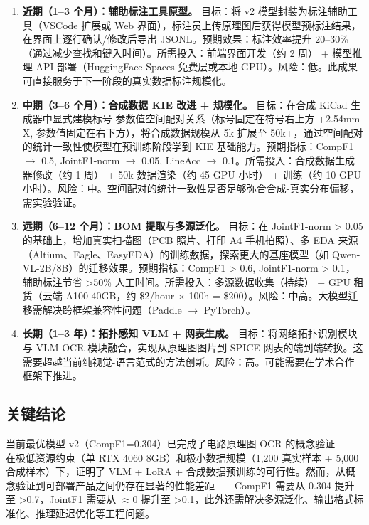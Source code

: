 \begin{enumerate}
    \item \textbf{近期（1--3 个月）：辅助标注工具原型。}
    目标：将 v2 模型封装为标注辅助工具（VSCode 扩展或 Web 界面），标注员上传原理图后获得模型预标注结果，在界面上逐行确认/修改后导出 JSONL。预期效果：标注效率提升 20--30\%（通过减少查找和键入时间）。所需投入：前端界面开发（约 2 周） + 模型推理 API 部署（HuggingFace Spaces 免费层或本地 GPU）。风险：低。此成果可直接服务于下一阶段的真实数据标注规模化。

    \item \textbf{中期（3--6 个月）：合成数据 KIE 改进 + 规模化。}
    目标：在合成 KiCad 生成器中显式建模标号-参数值空间配对关系（标号固定在符号右上方 +2.54mm X, 参数值固定在右下方），将合成数据规模从 5k 扩展至 50k+，通过空间配对的统计一致性使模型在预训练阶段学到 KIE 基础能力。预期指标：CompF1 $\to$ 0.5, JointF1-norm $\to$ 0.05, LineAcc $\to$ 0.1。所需投入：合成数据生成器修改（约 1 周） + 50k 数据渲染（约 45 GPU 小时） + 训练（约 10 GPU 小时）。风险：中。空间配对的统计一致性是否足够弥合合成-真实分布偏移，需实验验证。

    \item \textbf{远期（6--12 个月）：BOM 提取与多源泛化。}
    目标：在 JointF1-norm > 0.05 的基础上，增加真实扫描图（PCB 照片、打印 A4 手机拍照）、多 EDA 来源（Altium、Eagle、EasyEDA）的训练数据，探索更大的基座模型（如 Qwen-VL-2B/8B）的迁移效果。预期指标：CompF1 > 0.6, JointF1-norm > 0.1，辅助标注节省 >50\% 人工时间。所需投入：多源数据收集（持续） + GPU 租赁（云端 A100 40GB，约 \$2/hour $\times$ 100h = \$200）。风险：中高。大模型迁移需解决跨框架兼容性问题（Paddle $\to$ PyTorch）。

    \item \textbf{长期（1--3 年）：拓扑感知 VLM + 网表生成。}
    目标：将网络拓扑识别模块与 VLM-OCR 模块融合，实现从原理图图片到 SPICE 网表的端到端转换。这需要超越当前纯视觉-语言范式的方法创新。风险：高。可能需要在学术合作框架下推进。
\end{enumerate}

\subsection{关键结论}

当前最优模型 v2（CompF1=0.304）已完成了电路原理图 OCR 的概念验证——在极低资源约束（单 RTX 4060 8GB）和极小数据规模（1,200 真实样本 + 5,000 合成样本）下，证明了 VLM + LoRA + 合成数据预训练的可行性。然而，从概念验证到可部署产品之间仍存在显著的性能差距——CompF1 需要从 0.304 提升至 >0.7，JointF1 需要从 $\approx$0 提升至 >0.1，此外还需解决多源泛化、输出格式标准化、推理延迟优化等工程问题。

